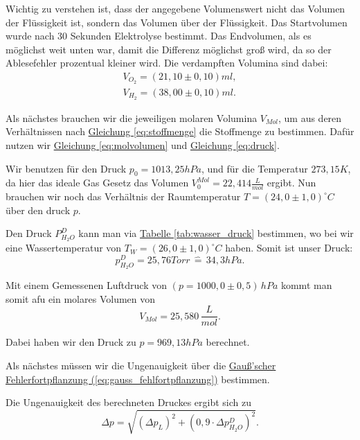 Wichtig zu verstehen ist, dass der angegebene Volumenswert nicht das Volumen der Flüssigkeit ist, sondern das Volumen über der Flüssigkeit. 
Das Startvolumen wurde nach 30 Sekunden Elektrolyse bestimmt. Das Endvolumen, als es möglichst weit unten war, damit die Differenz möglichst groß wird, da so der Ablesefehler prozentual kleiner wird.
Die verdampften Volumina sind dabei:
\begin{align}
    V_{O_2} = (21,10 \pm 0,10) ml, \\
    V_{H_2} = (38,00 \pm 0,10) ml.
\end{align}

Als nächstes brauchen wir die jeweiligen molaren Volumina $V_{Mol}$, um aus deren Verhältnissen nach \hyperref[eq:stoffmenge]{Gleichung \ref*{eq:stoffmenge}} die Stoffmenge zu bestimmen. 
Dafür nutzen wir \hyperref[eq:molvolumen]{Gleichung \ref*{eq:molvolumen}} und \hyperref[eq:druck]{Gleichung \ref*{eq:druck}}.

Wir benutzen für den Druck $p_0 = 1013,25 hPa$, und für die Temperatur $273,15K$, da hier das ideale Gas Gesetz das Volumen $V_0^{Mol} = 22,414 \frac{L}{mol}$ ergibt.
Nun brauchen wir noch das Verhältnis der Raumtemperatur $T = (24,0 \pm 1,0)^\circ C$ über den druck $p$. 

Den Druck $P_{H_2O}^D$ kann man via \hyperref[tab:wasser_druck]{Tabelle \ref*{tab:wasser_druck}} bestimmen, wo bei wir eine Wassertemperatur von $T_W = (26,0 \pm 1,0)^\circ C$ haben. Somit ist unser Druck:
\begin{equation}
    p_{H_2O}^D = 25,76 Torr \, \hat= \, 34,3 hPa.
\end{equation}

Mit einem Gemessenen Luftdruck von $(p = 1000,0 \pm 0,5) \, hPa$ kommt man somit afu ein molares Volumen von
\begin{equation}
    V_{Mol} = 25,580  \, \frac{L}{mol}.
\end{equation}

Dabei haben wir den Druck zu $p = 969,13 hPa$ berechnet.

Als nächstes müssen wir die Ungenauigkeit über die \hyperref[eq:gauss_fehlfortpflanzung]{Gauß'scher Fehlerfortpflanzung (\ref*{eq:gauss_fehlfortpflanzung})} bestimmen. 

Die Ungenauigkeit des berechneten Druckes ergibt sich zu
\begin{equation}
    \Delta p = \sqrt{(\Delta p_L)^2 + (0,9 \cdot \Delta p_{H_2O}^D)^2}.
\end{equation}

